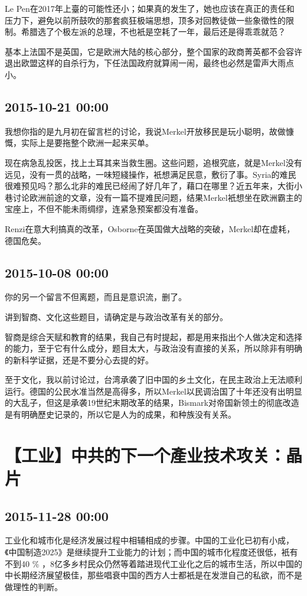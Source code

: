 \documentclass[twocolumn]{ctexart}
\begin{document}
Le Pen在2017年上臺的可能性还小；如果真的发生了，她也应该在真正的责任和压力下，避免以前所鼓吹的那套疯狂极端思想，顶多对回教徒做一些象徵性的限制。希腊选了个极左派的总理，不也衹是空耗了一年，最后还是得乖乖就范？

基本上法国不是英国，它是欧洲大陆的核心部分，整个国家的政商菁英都不会容许退出欧盟这样的自杀行为，下任法国政府就算闹一闹，最终也必然是雷声大雨点小。\subsection*{2015-10-21 00:00}
我想你指的是九月初在留言栏的讨论，我说Merkel开放移民是玩小聪明，故做慷慨，实际上是要拖整个欧洲一起来买单。

现在病急乱投医，找上土耳其来当救生圈。这些问题，追根究底，就是Merkel没有远见，没有一贯的战略，一味短綫操作，衹想满足民意，敷衍了事。Syria的难民很难预见吗？那么北非的难民已经闹了好几年了，藉口在哪里？近五年来，大街小巷讨论欧洲前途的文章，没有一篇不提难民问题，结果Merkel衹想坐在欧洲霸主的宝座上，不但不能未雨绸缪，连紧急预案都没有准备。

Renzi在意大利搞真的改革，Osborne在英国做大战略的突破，Merkel却在虚耗，德国危矣。\subsection*{2015-10-08 00:00}
你的另一个留言不但离题，而且是意识流，删了。

讲到智商、文化这些题目，请确定是与政治改革有关的部分。

智商是综合天赋和教育的结果，我自己有时提起，都是用来指出个人做决定和选择的能力，至于它有什么成分，题目太大，与政治没有直接的关系，所以除非有明确的新科学证据，还是不要分心去提的好。

至于文化，我以前讨论过，台湾承袭了旧中国的乡土文化，在民主政治上无法顺利运行。德国的公民水准当然是高得多，所以Merkel以民调治国了十年还没有出明显的大乱子，但这是承袭19世纪末期改革的结果，Bismark对帝国新领土的彻底改造是有明确歷史记录的，所以它是人为的成果，和种族没有关系。\section*{【工业】中共的下一个產业技术攻关：晶片}
\subsection*{2015-11-28 00:00}
工业化和城市化是经济发展过程中相辅相成的步骤。中国的工业化已初有小成，《中国制造2025》是继续提升工业能力的计划；而中国的城市化程度还很低，衹有不到40 \% ，8亿多乡村民众仍然等着踏进现代工业化之后的城市生活，所以中国的中长期经济展望极佳，那些唱衰中国的西方人士都衹是在发泄自己的私欲，而不是做理性的判断。
\end{document}
